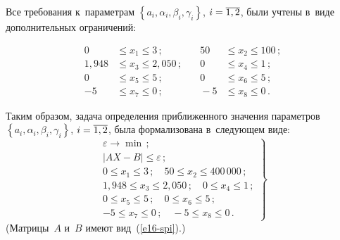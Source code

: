\begin{multicols}{2}
  Все требования к~параметрам $\left\{ a_i, \alpha_i, \beta_i, \gamma_i\right\}$,
$i\hm=\overline{1,2}$, были учтены в~виде дополнительных ограничений:

\noindent
  \begin{alignat*}{2}
  0&\leq x_1\leq 3\,; &\quad
  50& \leq x_2\leq 100\,;\\
  1{,}948 &\leq x_3\leq 2{,}050\,; &\quad
  0&\leq x_4\leq 1\,;\\
  0&\leq x_5\leq 5\,; &\quad
  0&\leq x_6\leq 5\,;\\
  -5&\leq x_7\leq 0\,; &\quad
  -5&\leq x_8 \leq 0\,.
  \end{alignat*}

  Таким образом, задача определения приближен\-ного значения параметров
$\left\{ a_i, \alpha_i, \beta_i, \gamma_i\right\}$, $i\hm=\overline{1,2}$, была
формализована в~следующем виде:
  \begin{equation}
  \left.
  \begin{array}{c}
  \varepsilon \to \min\,;\\[6pt]
  \vert AX-B\vert \leq \varepsilon\,;\\[6pt]
  0\leq x_1\leq 3\,;\quad
  50\leq x_2 \leq 400\,000\,;\\[6pt]
  1{,}948\leq x_3\leq 2{,}050\,;\quad
  0\leq x_4\leq 1\,;\\[6pt]
  0\leq x_5\leq 5\,;\quad
  0\leq x_6\leq 5\,;\\[6pt]
  -5\leq x_7 \leq 0\,;\quad
  -5\leq x_8 \leq 0\,.
  \end{array}
  \right\}
  \label{e17-spi}
  \end{equation}
  (Матрицы~$A$ и~$B$ имеют вид~(\ref{e16-spi}).)

  \begin{table*}\small %
\begin{center}
\vspace*{2ex}


\end{center}
\end{table*}
\end{multicols}
